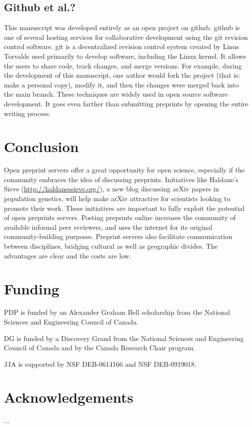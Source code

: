 \documentclass[letterpaper,twocolumn,superscriptaddress,showkeys]{revtex4}
\begin{document}
\subsection{Github et al.?}

This manuscript was developed entirely as an open project on
github. github is one of several hosting services for collaborative
development using the git revision control software.  git is a
decentralized revision control system created by Linus Torvalds used
primarily to develop software, including the Linux kernel. It allows
the users to share code, track changes, and merge versions. For
example, during the development of this manuscript, one author would
fork the project (that is: make a personal copy), modify it, and then
the changes were merged back into the main branch. These techniques
are widely used in open source software development. It goes even
farther than submitting preprints by opening the entire writing
process.

\section{Conclusion}

Open preprint servers offer a great opportunity for open science,
especially if the community embraces the idea of discussing
preprints. Initiatives like Haldane's Sieve
(\href{http://haldanessieve.org/}{http://haldanessieve.org/}), a new
blog discussing arXiv papers in population genetics, will help make
arXiv attractive for scientists looking to promote their work. These
initiatives are important to fully exploit the potential of open
preprints servers. Posting preprints online increases the community of
available informal peer reviewers, and uses the internet for its
original community-building purposes.  Preprint servers also
facilitate communication between disciplines, bridging cultural as
well as geographic divides. The advantages are clear and the costs are
low.

\section{Funding}

PDP is funded by an Alexander Graham Bell scholarship from the National Sciences
and Engineering Council of Canada.

DG is funded by a Discovery Grand from the National Sciences and Engineering
Council of Canada and by the Canada Research Chair program.

JJA is supported by NSF DEB-0614166 and NSF DEB-0919018.

\section{Acknowledgements}

...

\newpage


\end{document}
